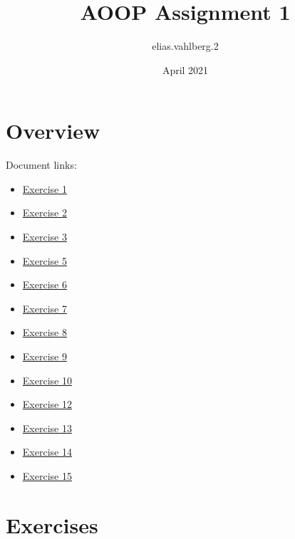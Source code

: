 \documentclass{article}
\title{AOOP Assignment 1 }
\author{elias.vahlberg.2 }
\date{April 2021}
\begin{document}
\maketitle


\section*{Overview}
Document links:
\begin{itemize}
\item \hyperlink{E1}{Exercise 1}
\item \hyperlink{E2}{Exercise 2}
\item \hyperlink{E3}{Exercise 3}
\item \hyperlink{E5}{Exercise 5}
\item \hyperlink{E6}{Exercise 6}
\item \hyperlink{E7}{Exercise 7}
\item \hyperlink{E8}{Exercise 8}
\item \hyperlink{E9}{Exercise 9}
\item \hyperlink{E10}{Exercise 10}
\item \hyperlink{E12}{Exercise 12}
\item \hyperlink{E13}{Exercise 13}
\item \hyperlink{E14}{Exercise 14}
\item \hyperlink{E15}{Exercise 15}
\end{itemize}

\section*{Exercises}
\end{document}

